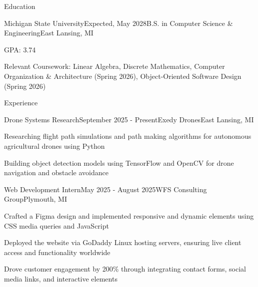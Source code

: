 \documentclass[
	11pt
]{resume}
\begin{document}
	\begin{rSection}{E}{ducation}
		\begin{rSectionEntry}{Michigan State University}{Expected, May 2028}{B.S. in Computer Science \& Engineering}{East Lansing, MI}
			\item GPA: 3.74
			\item Relevant Coursework: Linear Algebra, Discrete Mathematics, Computer Organization \& Architecture (Spring 2026), Object-Oriented Software Design (Spring 2026)
		\end{rSectionEntry}
	\end{rSection}

	\begin{rSection}{E}{xperience}
		\begin{rSectionEntry}{Drone Systems Research}{September 2025 - Present}{Exedy Drones}{East Lansing, MI}
			\item Researching flight path simulations and path making algorithms for autonomous agricultural drones using Python
			\item Building object detection models using TensorFlow and OpenCV for drone navigation and obstacle avoidance
		\end{rSectionEntry}

		\begin{rSectionEntry}{Web Development Intern}{May 2025 - August 2025}{WFS Consulting Group}{Plymouth, MI}
			\item Crafted a Figma design and implemented responsive and dynamic elements using CSS media queries and JavaScript
			\item Deployed the website via GoDaddy Linux hosting servers, ensuring live client access and functionality worldwide
			\item Drove customer engagement by 200\% through integrating contact forms, social media links, and interactive elements
		\end{rSectionEntry}
	\end{rSection}
\end{document}
